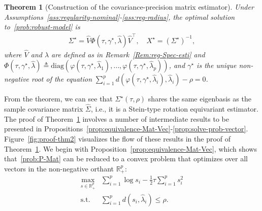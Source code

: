 \documentclass[11pt]{article}
\def\R{\mathbb{R}}
\newtheorem{theorem}{Theorem}
\newcommand{\bgeqn}{\begin{eqnarray}}
\newcommand{\edeqn}{\end{eqnarray}}
\newcommand{\opt}{^\star}
\newcommand{\Let}{\triangleq}
\def\st{\text{s.t.}}
\def\diag{\mathrm{diag}}
\def\transpose{\top}
\def\R{\mathbb{R}}
\newcommand{\wh}{\widehat}
\begin{document}
\begin{theorem}[Construction of the covariance-precision matrix estimator]\label{thm:close-form-dro}
    Under Assumptions~\ref{ass:regularity-nominal}-\ref{ass:reg-radius},  the optimal solution to~\eqref{prob:robust-model} is 
    \bgeqn 
    \label{eq:Thm2-construction}
    \Sigma\opt=\wh V \Phi(\tau, \gamma\opt, \widehat{\lambda}) \wh V^\transpose,\quad  X\opt=(\Sigma\opt)^{-1},
    \edeqn 
    where 
$\wh V$ and $\wh \lambda$ are defined as in Remark~\ref{Rem:reg-Spec-esti} and
    $ 
     \Phi(\tau, \gamma\opt, \widehat{\lambda})\Let \diag(\varphi(\tau, \gamma\opt, \widehat{\lambda}_1), \ldots ,\varphi(\tau, \gamma\opt, \widehat{\lambda}_p))$,
    and $\gamma\opt$ is the unique non-negative root of the equation $\sum_{i=1}^p d(\varphi(\tau, \gamma\opt, \widehat{\lambda}_i), \widehat{\lambda}_i)- \rho=0$.
\end{theorem}
From the theorem, we can see that $\Sigma\opt(\tau, \rho)$ shares the same eigenbasis as the sample covariance matrix $\wh\Sigma$, i.e., it is a Stein-type rotation equivariant estimator.
The proof of Theorem~\ref{thm:close-form-dro} involves a number of intermediate results to be presented in Propositions~\ref{prop:equivalence-Mat-Vec}-\ref{prop:solve-prob-vector}. Figure~\ref{fig:proof-thm2} visualizes the flow of these results in the proof of Theorem~\ref{thm:close-form-dro}. We begin with Proposition~\ref{prop:equivalence-Mat-Vec}, which shows that~\eqref{prob:P-Mat} can be reduced to a convex problem that optimizes over all vectors in the non-negative orthant $\R_+^p$:
\begin{equation}\tag{P-Vec}\label{prob:vector}
    \begin{array}{cl}
    \displaystyle\max_{s \in \R_+^p}&\displaystyle \sum_{i=1}^p \log s_i - \frac{1}{2}\tau \sum_{i=1}^p s_i^2\nonumber\\
    \st &\displaystyle \sum_{i=1}^p d(s_i, \widehat{\lambda}_i)\leq  \rho. 
    \end{array}
\end{equation}
 
\end{document}
